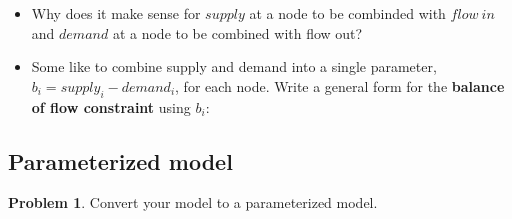\documentclass[11pt]{article}
\theoremstyle{definition}
\newtheorem{problem}{Problem}
\begin{document}
\begin{itemize}
\item Why does it make sense for $supply$ at a node to be combinded with $flow~in$ and $demand$ at a node to be combined with flow out?\vfill
\item Some like to combine supply and demand into a single parameter, $b_i = supply_i - demand_i$, for each node. Write a general form for the \textbf{balance of flow constraint} using $b_i$:
\vfill
\end{itemize}
\newpage

\subsection{Parameterized model}

\begin{problem}
Convert your model to a parameterized model. 
\end{problem}
\end{document}
